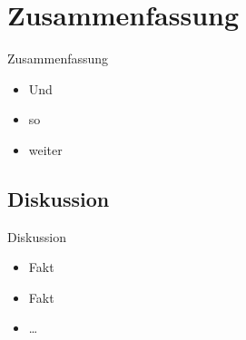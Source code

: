 \section{Zusammenfassung}
\begin{frame}{Zusammenfassung}
    \begin{itemize}
    	\item Und
    	\item so
    	\item weiter
    \end{itemize}
\end{frame}

\subsection{Diskussion}
\begin{frame}{Diskussion}
	\begin{itemize}
		\item Fakt
		\item Fakt
		\item \ldots
	\end{itemize}
\end{frame}